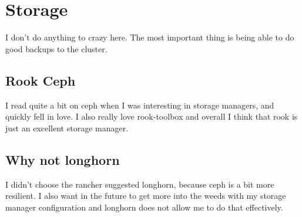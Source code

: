 \documentclass[12pt]{article}
\begin{document}
\section{Storage}
I don't do anything to crazy here. The most important thing is being able to do good backups to the cluster.

\subsection{Rook Ceph}
I read quite a bit on ceph when I was interesting in storage managers, and quickly fell in love. I also really love rook-toolbox and overall I think that rook is just an excellent storage manager.

\subsection{Why not longhorn}
I didn't choose the rancher suggested longhorn, because ceph is a bit more resilient. I also want in the future to get more into the weeds with my storage manager configuration and longhorn does not allow me to do that effectively.
\end{document}
